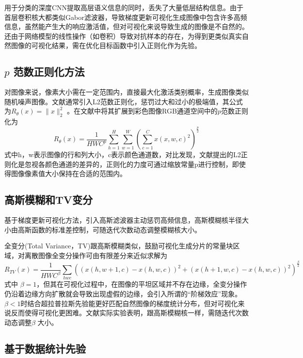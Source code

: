 用于分类的深度CNN提取高层语义信息的同时，丢失了大量低层结构信息。由于首层卷积核大都类似Gabor滤波器，导致梯度更新可视化生成图像中包含许多高频信息，虽然能产生大的响应激活值，但对可视化来说导致生成的图像是不自然的。还由于网络模型的线性操作（如卷积）导致对抗样本\citep{Goodfellow2014}的存在，为得到更类似真实自然图像的可视化结果，需在优化目标函数中引入正则化作为先验。
\subsection{$p$ 范数正则化方法} 

对图像来说，像素大小需在一定范围内，直接最大化激活类别概率，生成图像类似随机噪声图像。文献通常引入L2范数正则化，惩罚过大和过小的极端值，其公式为$R_{\theta}(x)=\parallel x \parallel _{2}^{2}$ 。在文献\citep{Mahendran2015}中将其扩展到彩色图像RGB通道空间中的$p$范数正则化为
\begin{equation} \label{eq:ch04_05}
       R_{\theta}(x)= \frac{1}{HWC^p}\sum_{h=1}^{H}\sum_{w=1}^{W}(\sum_{c=1}^{C}x(x,w,c)^2)^{\frac{p}{2}}
\end{equation}
式中h，w表示图像的行和列大小，c表示颜色通道数，对比发现，文献提出的L2正则化是忽视各颜色通道的差异的，正则化的力度可通过缩放常量p进行控制，即使得图像像素值大小保持在合适的范围内。
\subsection{高斯模糊和TV变分}

基于梯度更新可视化方法，引入高斯滤波器主动惩罚高频信息\citep{JasonYosinski2015}，高斯模糊核半径大小由高斯函数的标准差控制，可随迭代次数动态调整模糊核大小。

全变分\citep{Mahendran2015}(Total Variance，TV)跟高斯模糊类似，鼓励可视化生成分片的常量块区域，对离散图像全变分操作可由有限差分来近似求解为    \begin{equation} \label{eq:ch04_06}
       R_{TV}(x)= \frac{1}{HWC^\beta}\sum _{hwc}((x(h,w+1,c)-x(h,w,c))^2+(x(h+1,w,c)-x(h,w,c))^2)^{\frac{\beta}{2}}
\end{equation}
式中 $\beta =1$，但其在可视化过程中，在图像的平坦区域并不存在边缘，全变分操作仍沿着边缘方向扩散就会导致出现虚假的边缘，会引入所谓的“阶梯效应”现象。 $\beta<1$时结合超拉普拉斯先验\citep{Krishnan2009}能更好匹配自然图像的梯度统计分布，但对可视化来说反而使得可视化更困难。文献实际实验表明，跟高斯模糊核一样，需随迭代次数动态调整$\beta$ 大小。
\subsection{基于数据统计先验}

